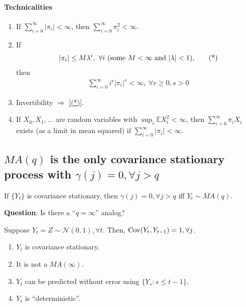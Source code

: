 \documentclass[11pt]{elegantbook}
\begin{document}
\paragraph*{Technicalities}
\begin{enumerate}[$\circ$]
    \item If $\sum_{i=0}^\infty |\pi_i|<\infty$, then $\sum_{i=0}^\infty\pi_i^2<\infty$.
    \item If
    \begin{equation}
        \begin{aligned}
            |\pi_i|\leq M \lambda^i,\ \forall i \textnormal{ (some $M<\infty$ and $|\lambda|<1$)},
        \end{aligned}
        \label{(*)}
        \tag{*}
    \end{equation}
    then
    \begin{equation}
        \begin{aligned}
            \sum_{i=0}^\infty i^r|\pi_i|^s<\infty,\ \forall r\geq 0,s>0
        \end{aligned}
        \nonumber
    \end{equation}
    \item Invertibility $\Rightarrow$ \eqref{(*)}.
    \item If $X_0,X_1,...$ are random variables with $\sup_i \mathbb{E}X_i^2<\infty$, then $\sum_{i=0}^\infty \pi_i X_i$ exists (as a limit in mean squared) if $\sum_{i=0}^\infty |\pi_i|<\infty$.
\end{enumerate}


\subsection{$MA(q)$ is the only covariance stationary process with $\gamma(j)=0,\forall j>q$}
\begin{proposition}[$MA(q)$ $\Leftrightarrow$ covariance stationary and $\gamma(j)=0,\forall j>q$]
    If $\{Y_t\}$ is covariance stationary, then $\gamma(j)=0,\forall j>q$ iff $Y_t\sim MA(q)$.
\end{proposition}
\textbf{Question}: Is there a ``$q=\infty$'' analog?
\begin{example}
    Suppose $Y_t=Z\sim \mathcal{N}(0,1), \forall t$. Then, $\textnormal{Cov}(Y_t,Y_{t-1})=1,\forall j$.
    \begin{enumerate}
        \item $Y_t$ is covariance stationary.
        \item It is not a $MA(\infty)$.
        \item $Y_t$ can be predicted without error using $\{Y_s:s\leq t-1\}$.
        \item $Y_t$ is ``deterministic''.
    \end{enumerate}
\end{example}
\end{document}
